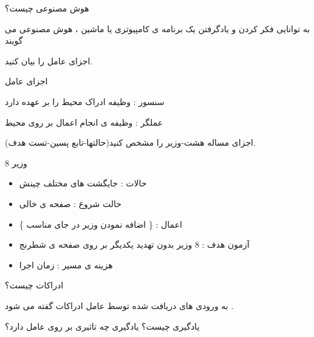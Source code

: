 \documentclass[12pt]{article}
\begin{document}
\noindent
هوش مصنوعی چیست؟



\begin{tcolorbox}
به توانایی فکر کردن و یادگرفتن یک برنامه ی کامپیوتری یا ماشین  ، هوش مصنوعی می گویند 
\end{tcolorbox}


\vspace{20pt}
\noindent
اجزای عامل را بیان کنید.


\begin{tcolorbox}
اجزای عامل

\noindent
سنسور 
 : وظیفه ادراک محیط را بر عهده دارد
 
 
\noindent
عملگر 
: وظیفه ی انجام اعمال بر روی محیط
\end{tcolorbox}



\vspace{20pt}
\noindent
اجزای مساله هشت-وزیر را مشخص کنید(حالتها-تابع پسین-تست هدف).



\begin{tcolorbox}
8 وزیر

\begin{itemize}
	\item حالات : جایگشت های مختلف چینش
	\item حالت شروع : صفحه ی خالی
	\item اعمال :
	\{ اضافه نمودن وزیر در جای مناسب \}
	\item آزمون هدف : 8 وزیر بدون تهدید یکدیگر بر روی صفحه ی شطرنج
	\item هزینه ی مسیر : زمان اجرا
\end{itemize}
\end{tcolorbox}



\vspace{20pt}
\noindent
ادراکات چیست؟


\begin{tcolorbox}
به ورودی های دریافت شده توسط عامل ادراکات گفته می شود .
\end{tcolorbox}



\newpage
\vspace{20pt}
\noindent
یادگیری چیست؟ یادگیری چه تاثیری بر روی عامل دارد؟
\end{document}
